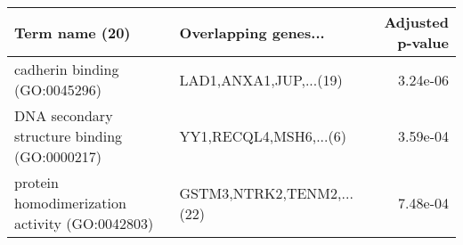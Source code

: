 \begin{tabular}{llr}
\toprule
                                Term name (20) &      Overlapping genes... &  Adjusted p-value \\
\midrule
                 cadherin binding (GO:0045296) &    LAD1,ANXA1,JUP,...(19) &          3.24e-06 \\
  DNA secondary structure binding (GO:0000217) &    YY1,RECQL4,MSH6,...(6) &          3.59e-04 \\
protein homodimerization activity (GO:0042803) & GSTM3,NTRK2,TENM2,...(22) &          7.48e-04 \\
\bottomrule
\end{tabular}
